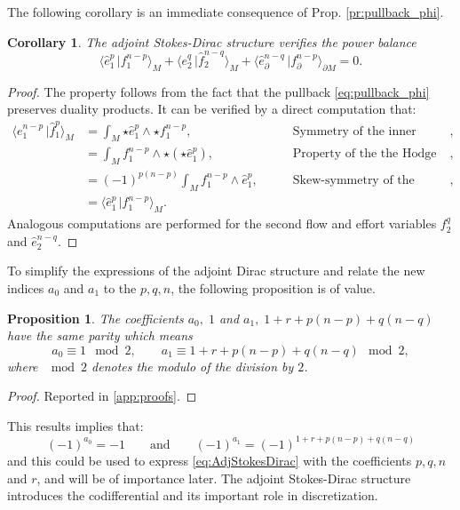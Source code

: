 \documentclass{elsarticle}
\newcommand{\revOne}[1]{{\color{black}#1}}
\newcommand{\revTwo}[1]{{\color{black}#1}}
\newtheorem{proposition}{Proposition}
\newtheorem{corollary}{Corollary}
\newcommand*{\dual}[1]{\ensuremath{\widehat{#1}}}
\newcommand{\dualpr}[3][]{\ensuremath{\langle #2 \, \vert #3 \rangle_{#1}}}
\begin{document}
\revTwo{The following corollary is an immediate consequence of Prop. \ref{pr:pullback_phi}.}
\begin{corollary}\label{cor:pow_bal_Adj}
The adjoint Stokes-Dirac structure verifies the power balance
\begin{equation}\label{eq:pow_bal_Adj}
    \dualpr[M]{\dual{e}^p_1}{{f}^{n-p}_1} + \dualpr[M]{{e}^q_2}{\dual{f}^{n-q}_2} + \dualpr[\partial M]{\dual{e}^{n-q}_\partial}{f^{n-p}_\partial} = 0.
\end{equation}
\end{corollary}
\begin{proof}
    The property follows from the fact that the pullback \eqref{eq:pullback_phi} preserves duality products. It can be  verified by a direct computation that:
    \begin{equation}
    \begin{aligned}
    \dualpr[M]{e^{n-p}_1}{\dual{f}^p_1} &= \int_M {\star \dual{e}^p_1} \wedge {\star {f}_1^{n-p}}, \qquad &\text{Symmetry of the inner product}, \\
    &= \int_M {f}_1^{n-p} \wedge \star (\star \dual{e}^p_1), \qquad &\text{Property of the the Hodge star}, \\
    &= (-1)^{p(n-p)} \int_M {f}_1^{n-p} \wedge  \dual{e}^p_1, \qquad &\text{Skew-symmetry of the wedge},  \\
    &= \dualpr[M]{\dual{e}^p_1}{{f}_1^{n-p}}.
    \end{aligned} 
\end{equation}
Analogous computations are performed for the second \revOne{flow} and effort variables $f^q_2$ and $\dual{e}^{n-q}_2$.
\end{proof}
To simplify the expressions of the adjoint Dirac structure and relate the new indices $a_0$ and $a_1$ to the $p,q,n$, the following proposition is of value.
\revTwo{
\begin{proposition}\label{pr:parity_a0_a1}
The coefficients $a_0, \;1$ and $a_1, \; 1+ r + p(n-p) + q(n-q)$ have the same parity which means
\begin{equation}
    a_0 \equiv 1 \mod{2}, \qquad a_1 \equiv 1+r+p(n-p) +q(n-q) \mod{2},
\end{equation}
where $\mod{2}$ denotes the modulo of the division by $2$.
\end{proposition}
\begin{proof}
Reported in \ref{app:proofs}.
\end{proof}
}
\noindent This results implies that:
\[
(-1)^{a_0}=-1
\qquad \text{and}
\qquad
(-1)^{a_1}=(-1)^{1+r+p(n-p)+q(n-q)}
\]
and this could be used to express \eqref{eq:AdjStokesDirac} with the coefficients $p,q,n$ and $r$, and will be of importance later. The adjoint Stokes-Dirac structure introduces the codifferential and its important role in discretization. 
\end{document}
